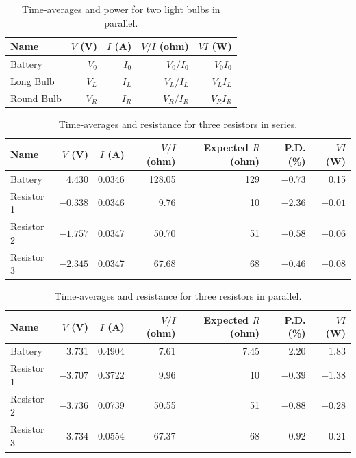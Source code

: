 %
\begin{table}[ht]
	\begin{center}
		\begin{tabular}{|l|r|r|r|r|}
			\hline
			Name & $V$ (V) & $I$ (A) & $V/I$ (ohm) & $V I$ (W) \\
			\hline
			Battery & $V_{0}$ & $I_{0}$ & $V_{0} / I_{0}$ & $V_{0} I_{0}$ \\
			Long Bulb & $V_{L}$ & $I_{L}$ & $V_{L} / I_{L}$ & $V_{L} I_{L}$ \\
			Round Bulb & $V_{R}$ & $I_{R}$ & $V_{R} / I_{R}$ & $V_{R} I_{R}$ \\
			\hline
		\end{tabular}
	\end{center}
	\caption{Time-averages and power for two light bulbs in parallel.}
	\label{table.03.bulbs.parallel}
\end{table}
%
\begin{table}[ht]
	\begin{center}
		\begin{tabular}{|l|r|r|r|r|r|r|}
			\hline
			Name & $V$ (V) & $I$ (A) & $V/I$ (ohm) & Expected $R$ (ohm) & P.D. (\%) & $V I$ (W) \\
			\hline
			Battery & 4.430 & 0.0346 & 128.05 & 129 & $-0.73$ & 0.15 \\
			Resistor 1 & $-0.338$ & 0.0346 & 9.76 & 10 & $-2.36$ & $-0.01$ \\
			Resistor 2 & $-1.757$ & 0.0347 & 50.70 & 51 & $-0.58$ & $-0.06$ \\
			Resistor 3 & $-2.345$ & 0.0347 & 67.68 & 68 & $-0.46$ & $-0.08$ \\
			\hline
		\end{tabular}
	\end{center}
	\caption{Time-averages and resistance for three resistors in series.}
	\label{table.03.3resistors.series}
\end{table}
%
\begin{table}[ht]
	\begin{center}
		\begin{tabular}{|l|r|r|r|r|r|r|}
			\hline
			Name & $V$ (V) & $I$ (A) & $V/I$ (ohm) & Expected $R$ (ohm) & P.D. (\%) & $V I$ (W) \\
			\hline
			Battery & 3.731 & 0.4904 & 7.61 & 7.45 & 2.20 & 1.83 \\
			Resistor 1 & $-3.707$ & 0.3722 & 9.96 & 10 & $-0.39$ & $-1.38$ \\
			Resistor 2 & $-3.736$ & 0.0739 & 50.55 & 51 & $-0.88$ & $-0.28$ \\
			Resistor 3 & $-3.734$ & 0.0554 & 67.37 & 68 & $-0.92$ & $-0.21$ \\
			\hline
		\end{tabular}
	\end{center}
	\caption{Time-averages and resistance for three resistors in parallel.}
	\label{table.03.3resistors.parallel}
\end{table}
%
\FloatBarrier
\newpage
